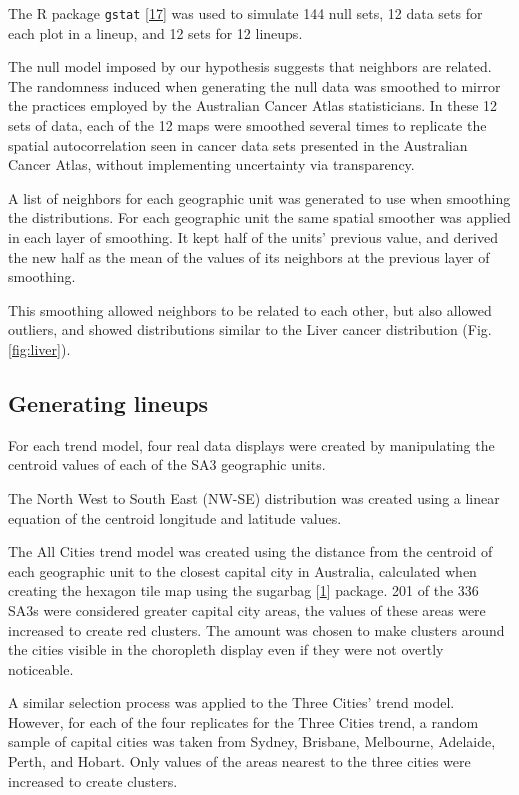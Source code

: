 \documentclass[conference,final,]{IEEEtran}
\begin{document}
The R package \texttt{gstat} {[}\protect\hyperlink{ref-gstat}{17}{]} was used to simulate 144 null sets, 12 data sets for each plot in a lineup, and 12 sets for 12 lineups.

The null model imposed by our hypothesis suggests that neighbors are related. The randomness induced when generating the null data was smoothed to mirror the practices employed by the Australian Cancer Atlas statisticians.
In these 12 sets of data, each of the 12 maps were smoothed several times to replicate the spatial autocorrelation seen in cancer data sets presented in the Australian Cancer Atlas, without implementing uncertainty via transparency.

A list of neighbors for each geographic unit was generated to use when smoothing the distributions. For each geographic unit the same spatial smoother was applied in each layer of smoothing. It kept half of the units' previous value, and derived the new half as the mean of the values of its neighbors at the previous layer of smoothing.

This smoothing allowed neighbors to be related to each other, but also allowed outliers, and showed distributions similar to the Liver cancer distribution (Fig. \ref{fig:liver}).

\hypertarget{generating-lineups}{%
\subsection{Generating lineups}\label{generating-lineups}}

For each trend model, four real data displays were created by manipulating the centroid values of each of the SA3 geographic units.

The North West to South East (NW-SE) distribution was created using a linear equation of the centroid longitude and latitude values.

The All Cities trend model was created using the distance from the centroid of each geographic unit to the closest capital city in Australia, calculated when creating the hexagon tile map using the sugarbag {[}\protect\hyperlink{ref-sugarbag}{1}{]} package.
201 of the 336 SA3s were considered greater capital city areas, the values of these areas were increased to create red clusters. The amount was chosen to make clusters around the cities visible in the choropleth display even if they were not overtly noticeable.

A similar selection process was applied to the Three Cities' trend model. However, for each of the four replicates for the Three Cities trend, a random sample of capital cities was taken from Sydney, Brisbane, Melbourne, Adelaide, Perth, and Hobart. Only values of the areas nearest to the three cities were increased to create clusters.
\end{document}

